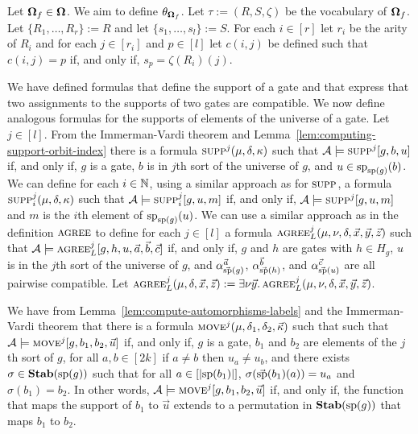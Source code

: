 \documentclass[../main/thesis.tex]{subfiles}
\begin{document}
Let $\mathbf{\mathbf{\Omega}}_f \in \mathbf{\mathbf{\Omega}}$. We aim to define $\theta_{\mathbf{\mathbf{\Omega}}_f}$. Let $\tau :=
(R, S, \zeta)$ be the vocabulary of $\mathbf{\mathbf{\Omega}}_f$. Let $\{R_1, \ldots, R_r\} := R$
and let $\{s_1, \ldots, s_l\} := S$. For each $i \in [r]$ let $r_i$ be the arity
of $R_i$ and for each $j \in [r_i]$ and $p \in [l]$ let $c(i, j)$ be defined
such that $c(i, j) = p$ if, and only if, $s_p = \zeta(R_i)(j)$.

We have defined formulas that define the support of a gate and that express that
two assignments to the supports of two gates are compatible. We now define
analogous formulas for the supports of elements of the universe of a gate. Let
$j \in [l]$. From the Immerman-Vardi theorem and
Lemma~\ref{lem:computing-support-orbit-index} there is a formula
$\textsc{supp}^j(\mu, \delta, \kappa)$ such that $\mathcal{A} \models \textsc{supp}^j[g,
b, u]$ if, and only if, $g$ is a gate, $b$ is in $j$th sort of the universe of
$g$, and $u \in \text{sp}_{\text{sp}(g)}(b)$. We can define for each $i \in \mathbb{N}$,
using a similar approach as for $\textsc{supp}$, a formula $\textsc{supp}^j_i(\mu,
\delta, \kappa)$ such that $\mathcal{A} \models \textsc{supp}^j_i[g, u, m]$ if, and
only if, $\mathcal{A} \models \textsc{supp}^j[g, u, m]$ and $m$ is the $i$th element
of $\text{sp}_{\text{sp}(g)}(u)$. We can use a similar approach as in the definition
$\textsc{agree}$ to define for each $j \in [l]$ a formula $\textsc{agree}^j_L (\mu, \nu,
\delta, \vec{x}, \vec{y}, \vec{z})$ such that $\mathcal{A} \models
\textsc{agree}^j_L [g, h, u, \vec{a}, \vec{b}, \vec{c}]$ if, and only if, $g$ and
$h$ are gates with $h \in H_g$, $u$ is in the $j$th sort of the universe of $g$,
and $\alpha^{\vec{a}}_{\vec{\text{sp}}(g)}$, $\alpha^{\vec{b}}_{\vec{\text{sp}}(h)}$,
and $\alpha^{\vec{c}}_{\vec{\text{sp}}(u)}$ are all pairwise compatible. Let
$\textsc{agree}^j_L(\mu, \delta, \vec{x}, \vec{z}) := \exists \nu \vec{y}. \,
\textsc{agree}^j_L (\mu, \nu, \delta, \vec{x}, \vec{y}, \vec{z})$.

We have from Lemma~\ref{lem:compute-automorphisms-labels} and the Immerman-Vardi
theorem that there is a formula $\textsc{move}^j(\mu, \delta_1, \delta_2,
\vec{\kappa})$ such that such that $\mathcal{A} \models \textsc{move}^j[g, b_1, b_2,
\vec{u}]$ if, and only if, $g$ is a gate, $b_1$ and $b_2$ are elements of the
$j$th sort of $g$, for all $a, b \in [2k]$ if $a \neq b$ then $u_a \neq u_b$,
and there exists $\sigma \in \text{\textbf{Stab}} (\text{sp} (g))$ such that for all $a \in [\vert
\text{sp}(b_1) \vert]$, $\sigma (\vec{\text{sp}}(b_1)(a)) = u_a$ and $\sigma (b_1) =
b_2$. In other words, $\mathcal{A} \models \textsc{move}^j[g, b_1, b_2, \vec{u}]$
if, and only if, the function that maps the support of $b_1$ to $\vec{u}$
extends to a permutation in $\text{\textbf{Stab}} (\text{sp} (g))$ that maps $b_1$ to $b_2$.
\end{document}
